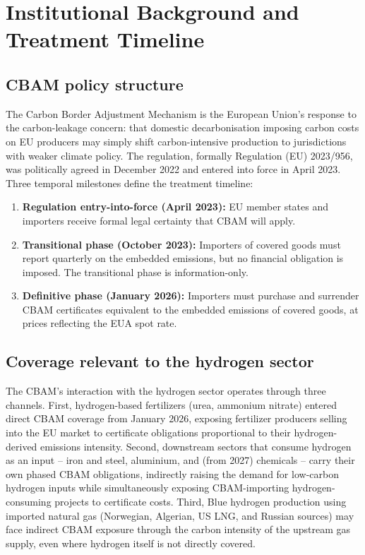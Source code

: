 \documentclass[11pt,a4paper]{article}
\begin{document}
\section{Institutional Background and Treatment Timeline}
\label{sec:ch8-institutional}

\subsection{CBAM policy structure}

The Carbon Border Adjustment Mechanism is the European Union's response to the carbon-leakage concern: that domestic decarbonisation imposing carbon costs on EU producers may simply shift carbon-intensive production to jurisdictions with weaker climate policy. The regulation, formally Regulation (EU) 2023/956, was politically agreed in December 2022 and entered into force in April 2023. Three temporal milestones define the treatment timeline:

\begin{enumerate}
\item \textbf{Regulation entry-into-force (April 2023):} EU member states and importers receive formal legal certainty that CBAM will apply.
\item \textbf{Transitional phase (October 2023):} Importers of covered goods must report quarterly on the embedded emissions, but no financial obligation is imposed. The transitional phase is information-only.
\item \textbf{Definitive phase (January 2026):} Importers must purchase and surrender CBAM certificates equivalent to the embedded emissions of covered goods, at prices reflecting the EUA spot rate.
\end{enumerate}

\subsection{Coverage relevant to the hydrogen sector}

The CBAM's interaction with the hydrogen sector operates through three channels. First, hydrogen-based fertilizers (urea, ammonium nitrate) entered direct CBAM coverage from January 2026, exposing fertilizer producers selling into the EU market to certificate obligations proportional to their hydrogen-derived emissions intensity. Second, downstream sectors that consume hydrogen as an input -- iron and steel, aluminium, and (from 2027) chemicals -- carry their own phased CBAM obligations, indirectly raising the demand for low-carbon hydrogen inputs while simultaneously exposing CBAM-importing hydrogen-consuming projects to certificate costs. Third, Blue hydrogen production using imported natural gas (Norwegian, Algerian, US LNG, and Russian sources) may face indirect CBAM exposure through the carbon intensity of the upstream gas supply, even where hydrogen itself is not directly covered.
\end{document}
